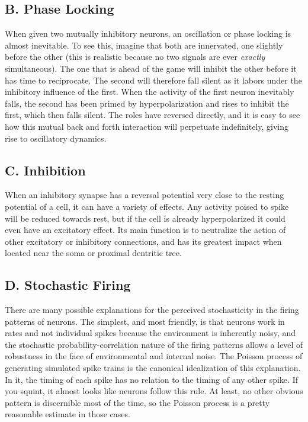 \documentclass[12pt]{article}
\begin{document}
\subsection{B. Phase Locking}

When given two mutually inhibitory neurons, an oscillation or phase locking is almost inevitable.  To see this, imagine that both are innervated, one slightly before the other (this is realistic because no two signals are ever {\em exactly} simultaneous).  The one that is ahead of the game will inhibit the other before it has time to reciprocate.  The second will therefore fall silent as it labors under the inhibitory influence of the first.  When the activity of the first neuron inevitably falls, the second has been primed by hyperpolarization and rises to inhibit the first, which then falls silent.  The roles have reversed directly, and it is easy to see how this mutual back and forth interaction will perpetuate indefinitely, giving rise to oscillatory dynamics.

\subsection{C. Inhibition}

When an inhibitory synapse has a reversal potential very close to the resting potential of a cell, it can have a variety of effects.  Any activity poised to spike will be reduced towards rest, but if the cell is already hyperpolarized it could even have an excitatory effect.  Its main function is to neutralize the action of other excitatory or inhibitory connections, and has its greatest impact when located near the soma or proximal dentritic tree. 

\subsection{D. Stochastic Firing}

There are many possible explanations for the perceived stochasticity in the firing patterns of neurons.  The simplest, and most friendly, is that neurons work in rates and not individual spikes because the environment is inherently noisy, and the stochastic probability-correlation nature of the firing patterns allows a level of robustness in the face of environmental and internal noise.  The Poisson process of generating simulated spike trains is the canonical idealization of this explanation.  In it, the timing of each spike has no relation to the timing of any other spike.  If you squint, it almost looks like neurons follow this rule.  At least, no other obvious pattern is discernible most of the time, so the Poisson process is a pretty reasonable estimate in those cases.  
\end{document}
